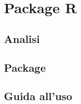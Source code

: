 
\chapter{Package R}
\label{cap:r}
\lipsum[1]

\section{Analisi}
\lipsum[2]

\section{Package}
\lipsum[3]

\section{Guida all'uso}
\lipsum[4]
